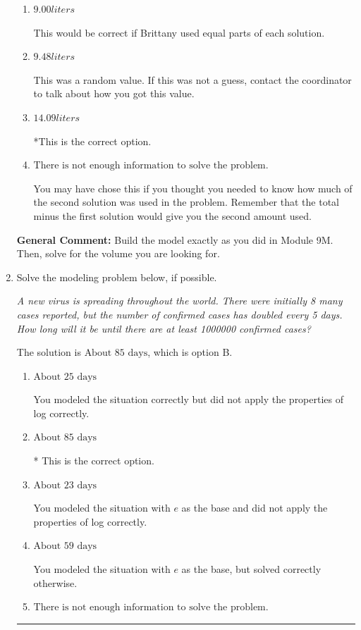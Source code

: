 \documentclass{extbook}[14pt]
\newcommand{\litem}[1]{\item #1

\rule{\textwidth}{0.4pt}}
\begin{document}
\begin{enumerate}
{\begin{enumerate}[label=\Alph*.]
This is the concentration of 28 percent solution.
\item \( 9.00 liters \)

This would be correct if Brittany used equal parts of each solution.
\item \( 9.48 liters \)

This was a random value. If this was not a guess, contact the coordinator to talk about how you got this value.
\item \( 14.09 liters \)

*This is the correct option.
\item \( \text{There is not enough information to solve the problem.} \)

You may have chose this if you thought you needed to know how much of the second solution was used in the problem. Remember that the total minus the first solution would give you the second amount used.
\end{enumerate}

\textbf{General Comment:} Build the model exactly as you did in Module 9M. Then, solve for the volume you are looking for.
}
\litem{
Solve the modeling problem below, if possible.

\begin{center}
    \textit{ A new virus is spreading throughout the world. There were initially 8 many cases reported, but the number of confirmed cases has doubled every 5 days. How long will it be until there are at least 1000000 confirmed cases? }
\end{center}
The solution is \( \text{About } 85 \text{ days} \), which is option B.\begin{enumerate}[label=\Alph*.]
\item \( \text{About } 25 \text{ days} \)

You modeled the situation correctly but did not apply the properties of log correctly.
\item \( \text{About } 85 \text{ days} \)

* This is the correct option.
\item \( \text{About } 23 \text{ days} \)

You modeled the situation with $e$ as the base and did not apply the properties of log correctly.
\item \( \text{About } 59 \text{ days} \)

You modeled the situation with $e$ as the base, but solved correctly otherwise.
\item \( \text{There is not enough information to solve the problem.} \)


\end{enumerate}}
\end{enumerate}
\end{document}

